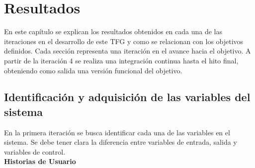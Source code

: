 \chapter{Resultados}
\label{cap:Resultados}
En este capítulo se explican los resultados obtenidos en cada una de las iteraciones en el desarrollo de este \gls{TFG} y como se relacionan con los objetivos definidos. Cada sección representa una iteración en el avance hacia el objetivo. A partir de la iteración 4 se realiza una integración continua hasta el hito final, obteniendo como salida una versión funcional del objetivo.

\section{Identificación y adquisición de las variables del sistema}
\label{sec:hito1}
En la primera iteración se busca identificar cada una de las variables en el sistema. Se debe tener clara la diferencia entre variables de entrada, salida y variables de control.\\

\textbf{Historias de Usuario}\\

